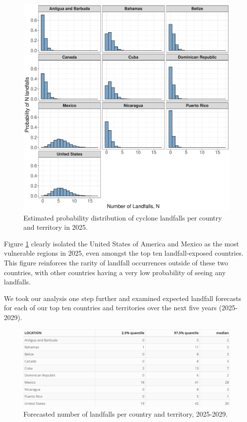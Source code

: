 \documentclass[
]{article}
\begin{document}
\newpage
\begin{figure}

{\centering \includegraphics[width=0.82\linewidth]{../outputs/bayesian-analysis-country-freq/landfall-per-country-density-plots} 

}

\caption{Estimated probability distribution of cyclone landfalls per country and territory in 2025.}\label{fig:figs7}
\end{figure}

Figure \ref{fig:figs7} clearly isolated the United States of America and Mexico as the most vulnerable regions in 2025, even amongst the top ten landfall-exposed countries. This figure reinforces the rarity of landfall occurrences outside of these two countries, with other countries having a very low probability of seeing any landfalls.

We took our analysis one step further and examined expected landfall forecasts for each of our top ten countries and territories over the next five years (2025-2029).

\begin{figure}

{\centering \includegraphics[width=1\linewidth]{../outputs/bayesian-analysis-country-freq/simple-landfalls-per-country-forecasts} 

}

\caption{Forecasted number of landfalls per country and territory, 2025-2029.}\label{fig:figs8}
\end{figure}
\end{document}
